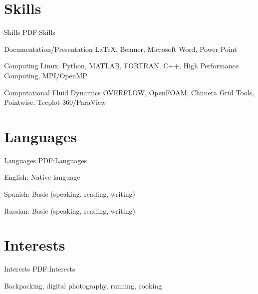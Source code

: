 \documentclass[letterpaper,MMMyyyy,nonstop]{simpleresumecv}
\begin{document}
\begin{body}

\section
{Skills}
{Skills}
{PDF:Skills}

Documentation/Presentation
\BulletItem
{\LaTeX},
Beamer,
Microsoft Word, Power Point

\GapNoBreak
Computing
\BulletItem
Linux,
Python,
MATLAB,
FORTRAN,
C++,
High Performance Computing,
MPI/OpenMP

\GapNoBreak
Computational Fluid Dynamics
\BulletItem
OVERFLOW,
OpenFOAM,
Chimera Grid Tools,
Pointwise,
Tecplot 360/ParaView



\section
{Languages}
{Languages}
{PDF:Languages}

\BulletItem
English: Native language

\GapNoBreak
\BulletItem
Spanish: Basic (speaking, reading, writing)

\GapNoBreak
\BulletItem
Russian: Basic (speaking, reading, writing)


\section
{Interests}
{Interests}
{PDF:Interests}

Backpacking,
digital photography,
running,
cooking





\end{body}
\end{document}

